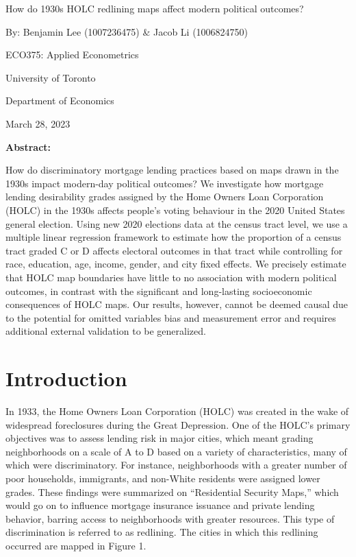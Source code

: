 \documentclass{eco_375_paper}
\begin{document}
\vspace*{\fill}
\begin{center}
	How do 1930s HOLC redlining maps affect modern political outcomes?
	
	By: Benjamin Lee (1007236475) \& Jacob Li (1006824750)
	\bigskip
	
	ECO375: Applied Econometrics 
	
	University of Toronto
	
	Department of Economics
	
	March 28, 2023
	
	\bigskip
	\textbf{Abstract: }
	
	How do discriminatory mortgage lending practices based on maps drawn in the 1930s impact modern-day political outcomes? We investigate how mortgage lending desirability grades assigned by the Home Owners Loan Corporation (HOLC) in the 1930s affects people’s voting behaviour in the 2020 United States general election. Using new 2020 elections data at the census tract level, we use a multiple linear regression framework to estimate how the proportion of a census tract graded C or D affects electoral outcomes in that tract while controlling for race, education, age, income, gender, and city fixed effects. We precisely estimate that HOLC map boundaries have little to no association with modern political outcomes, in contrast with the significant and long-lasting socioeconomic consequences of HOLC maps. Our results, however, cannot be deemed causal due to the potential for omitted variables bias and measurement error and requires additional external validation to be generalized.
\end{center}
\vspace*{\fill}
\pagebreak

\section*{Introduction}
In 1933, the Home Owners Loan Corporation (HOLC) was created in the wake of widespread foreclosures during the Great Depression. One of the HOLC’s primary objectives was to assess lending risk in major cities, which meant grading neighborhoods on a scale of A to D based on a variety of characteristics, many of which were discriminatory. For instance, neighborhoods with a greater number of poor households, immigrants, and non-White residents were assigned lower grades. These findings were summarized on “Residential Security Maps,” which would go on to influence mortgage insurance issuance and private lending behavior, barring access to neighborhoods with greater resources. This type of discrimination is referred to as redlining. The cities in which this redlining occurred are mapped in Figure 1.
\end{document}

